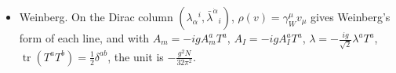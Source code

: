 \begin{remark}
\begin{itemize}
\[
D_1:\ (A_{ij},A_{kl})\mapsto\Big[8A_{kl}A_{ij}-2\varepsilon_{ijkl}A^{mn}A_{mn}-8A_{ij}A_{kl}-\tfrac12\big(\tfrac13+\theta\big)\big(\big((2E+2)A_{ij}\big)A_{kl}+A_{ij}\big((2E+2)A_{kl}\big)\big)\Big]\ \text{units},
\]
so that on $\operatorname{tr}(A_{I_1}\cdots A_{I_L})$, $D_1=-8$ units times $\sum_l(1-\text{exchange}+\tfrac12\,\text{trace})_{l,l+1}$ minus $(\tfrac13+\theta)$ units times $2(E+L)$. For the Konishi operator $\tfrac14\int\omega\,(A^{ij},A_{ij})$ at the value $\theta=-\tfrac13$ of Theorem \ref{thm:c9-theta2}, $D_1=-48$ units times $O$, which is $\frac{3g^2N}{2\pi^2}O$ for $\mathfrak{su}(N)$, twice the Konishi anomalous dimension $\frac{3g^2N}{4\pi^2}$.
\item Weinberg. On the Dirac column $(\lambda_\alpha{}^i,\bar\lambda^{\dot\alpha}{}_i)$, $\rho(v)=\gamma_W^\mu v_\mu$ gives Weinberg's form of each line, and with $A_m=-igA^a_mT^a$, $A_I=-igA^a_IT^a$, $\lambda=-\tfrac{ig}{\sqrt2}\lambda^aT^a$, $\operatorname{tr}(T^aT^b)=\tfrac12\delta^{ab}$, the unit is $-\frac{g^2N}{32\pi^2}$.
\end{itemize}
\end{remark}
